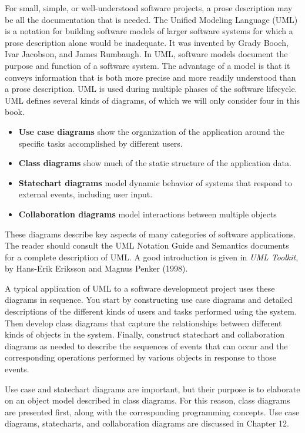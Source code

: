 For small, simple, or well-understood software projects, a prose description
may be all the documentation that is needed. The Unified Modeling Language
(UML) is a notation for building software models of larger software
systems for which a prose description alone would be inadequate. It was
invented by Grady Booch, Ivar Jacobson, and James Rumbaugh. In UML, software
models document the purpose and function of a software system.
The advantage of a model is that it conveys
information that is both more precise and more readily understood than
a prose description. UML is used during multiple phases of the software
lifecycle. UML defines several kinds of diagrams, of which we will only
consider four in this book.

\begin{itemize}
\item \textbf{Use case diagrams} show the organization of the
application around the specific tasks accomplished by different users.
\item \textbf{Class diagrams} show much of the static structure of the
application data.
\item \textbf{Statechart diagrams} model dynamic behavior of systems
that respond to external events, including user input.
\item \textbf{Collaboration diagrams} model interactions between
multiple objects
\end{itemize}
These diagrams describe key aspects of many categories of software
applications. The reader should consult the UML Notation Guide and
Semantics documents for a complete description of UML. A good
introduction is given in \textit{UML Toolkit}, by Hans-Erik Eriksson
and Magnus Penker (1998).

A typical application of UML to a software development project uses
these diagrams in sequence. You start by constructing
use case diagrams and detailed descriptions of the different kinds of
users and tasks performed using the system. Then develop class diagrams
that capture the relationships between different kinds of objects
in the system. Finally, construct statechart and
collaboration diagrams as needed to describe the sequences of events
that can occur and the corresponding operations performed by various
objects in response to those events.

Use case and statechart diagrams are important, but their purpose is
to elaborate on an object model described in class diagrams. For this
reason, class diagrams are
presented first, along with the corresponding programming
concepts. Use case diagrams, statecharts, and collaboration diagrams
are discussed in Chapter 12.

